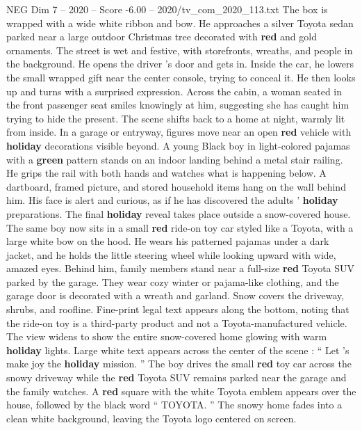 \begin{textsample}{NEG Dim 7 – 2020 – Score -6.00 – 2020/tv\_com\_2020\_113.txt}
The box is wrapped with a wide white ribbon and bow.
He approaches a silver Toyota sedan parked near a large outdoor Christmas tree decorated with \textbf{red} and gold ornaments.
The street is wet and festive, with storefronts, wreaths, and people in the background.
He opens the driver ’s door and gets in.
Inside the car, he lowers the small wrapped gift near the center console, trying to conceal it.
He then looks up and turns with a surprised expression.
Across the cabin, a woman seated in the front passenger seat smiles knowingly at him, suggesting she has caught him trying to hide the present.
The scene shifts back to a home at night, warmly lit from inside.
In a garage or entryway, figures move near an open \textbf{red} vehicle with \textbf{holiday} decorations visible beyond.
A young Black boy in light-colored pajamas with a \textbf{green} pattern stands on an indoor landing behind a metal stair railing.
He grips the rail with both hands and watches what is happening below.
A dartboard, framed picture, and stored household items hang on the wall behind him.
His face is alert and curious, as if he has discovered the adults ’ \textbf{holiday} preparations.
The final \textbf{holiday} reveal takes place outside a snow-covered house.
The same boy now sits in a small \textbf{red} ride-on toy car styled like a Toyota, with a large white bow on the hood.
He wears his patterned pajamas under a dark jacket, and he holds the little steering wheel while looking upward with wide, amazed eyes.
Behind him, family members stand near a full-size \textbf{red} Toyota SUV parked by the garage.
They wear cozy winter or pajama-like clothing, and the garage door is decorated with a wreath and garland.
Snow covers the driveway, shrubs, and roofline.
Fine-print legal text appears along the bottom, noting that the ride-on toy is a third-party product and not a Toyota-manufactured vehicle.
The view widens to show the entire snow-covered home glowing with warm \textbf{holiday} lights.
Large white text appears across the center of the scene : “ Let ’s make joy the \textbf{holiday} mission. ” The boy drives the small \textbf{red} toy car across the snowy driveway while the \textbf{red} Toyota SUV remains parked near the garage and the family watches.
A \textbf{red} square with the white Toyota emblem appears over the house, followed by the black word “ TOYOTA. ” The snowy home fades into a clean white background, leaving the Toyota logo centered on screen.

\end{textsample}
